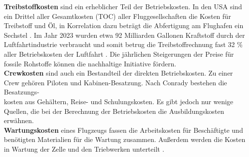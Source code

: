 %
\textbf{Treibstoffkosten} sind ein erheblicher Teil der Betriebskosten. 
In den USA sind ein Drittel aller Gesamtkosten (TOC) aller Fluggesellschaften 
die Kosten für Treibstoff und Öl, in Korrelation dazu beträgt 
die Abfertigung am Flughafen ein Sechstel \cite{conrady2019luftverkehr}. 
Im Jahr 2023 wurden etwa 92 Milliarden Gallonen Kraftstoff durch der 
Luftfahrtindustrie verbraucht und somit betrug die Treibstoffrechnung fast 32 \% 
aller Betriebskosten der Luftfahrt \cite{iata_industry_statistics_2024}.
Die jährlichen Steigerungen der Preise für fossile Rohstoffe können die nachhaltige Initiative fördern. \\
%
%
%
\textbf{Crewkosten} sind auch ein Bestandteil der direkten Betriebskosten. 
Zu einer Crew gehören Piloten und Kabinen-Besatzung.
Nach Conrady \cite{conrady2019luftverkehr} bestehen die Besatzungs-\\kosten aus 
Gehältern, Reise- und Schulungskosten. Es gibt jedoch nur wenige Quellen, 
die bei der Berechnung der Betriebskosten die Ausbildungskosten erwähnen. \\
%
\textbf{Wartungskosten} eines Flugzeugs fassen die Arbeitskosten für Beschäftigte
und benötigten Materialien für die Wartung zusammen.
Außerdem werden die Kosten in Wartung der Zelle und den Triebwerken unterteilt \cite{wang2021research}. 
